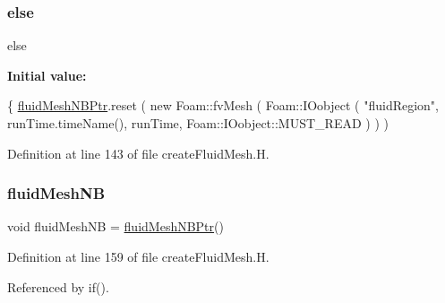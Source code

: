 \subsubsection{\texorpdfstring{else}{else}}
{\footnotesize\ttfamily else}

{\bfseries Initial value\+:}
\begin{DoxyCode}
\{
    \hyperlink{createFluidMesh_8H_ad579f374cb4a624fed8d34a887d51bed}{fluidMeshNBPtr}.reset
    (
        \textcolor{keyword}{new} Foam::fvMesh
        (
            Foam::IOobject
            (
                \textcolor{stringliteral}{"fluidRegion"},
                runTime.timeName(),
                runTime,
                Foam::IOobject::MUST\_READ
            )
        )
    )
\end{DoxyCode}


Definition at line 143 of file create\+Fluid\+Mesh.\+H.

\mbox{\label{createFluidMesh_8H_a19096e6b5a147939b336269d09a08e3c}} 
\subsubsection{\texorpdfstring{fluid\+Mesh\+NB}{fluidMeshNB}}
{\footnotesize\ttfamily void fluid\+Mesh\+NB = \hyperlink{createFluidMesh_8H_ad579f374cb4a624fed8d34a887d51bed}{fluid\+Mesh\+N\+B\+Ptr}()}



Definition at line 159 of file create\+Fluid\+Mesh.\+H.



Referenced by if().

